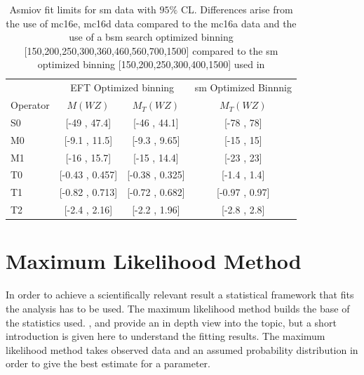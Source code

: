 \documentclass[../Bachelorarbeit.tex]{subfiles}
\begin{document}
\begin{table}
    \centering
    \begin{tabular}{l | c c | c }
        \hline
                 & \multicolumn{2}{c|}{EFT Optimized binning} & \acrshort{sm} Optimized Binnnig                  \\
        Operator & $M(WZ)$                                    & $M_{T}(WZ)$                     & $M_{T}(WZ)$    \\
        \hline
        S0       & [-49 , 47.4]                               & [-46 , 44.1]                    & [-78 , 78]     \\
        M0       & [-9.1 , 11.5]                              & [-9.3 , 9.65]                   & [-15 , 15]     \\
        M1       & [-16 , 15.7]                               & [-15 , 14.4]                    & [-23 , 23]     \\
        T0       & [-0.43 , 0.457]                            & [-0.38 , 0.325]                 & [-1.4 , 1.4]   \\
        T1       & [-0.82 , 0.713]                            & [-0.72 , 0.682]                 & [-0.97 , 0.97] \\
        T2       & [-2.4 , 2.16]                              & [-2.2 , 1.96]                   & [-2.8 , 2.8]   \\
        \hline
    \end{tabular}
    \caption{Asmiov fit limits for \acrshort{sm} data with $95\%$ CL. Differences arise from the use of mc16e, mc16d data compared to the mc16a data and the use of a \acrshort{bsm} search optimized binning [150,200,250,300,360,460,560,700,1500] compared to the \acrshort{sm} optimized binning [150,200,250,300,400,1500] used in \cite{Sampsonidou.25.11.2021}}
    \label{tab:asimov}
\end{table}

\section{Maximum Likelihood Method}
In order to achieve a scientifically relevant result a statistical framework that fits the analysis has to be used.  The maximum likelihood method builds the base of the statistics used. \cite{Prof.Dr.KlausReygersDr.RainerStamen.2020}, \cite{Prof.MarkusSchumacherDr.StanLai.2012} and \cite{K.F.RILEY.} provide an in depth view into the topic, but a short introduction is given here to understand the fitting results.
The maximum likelihood method takes observed data and an assumed probability distribution in order to give the best estimate for a parameter.
\end{document}
